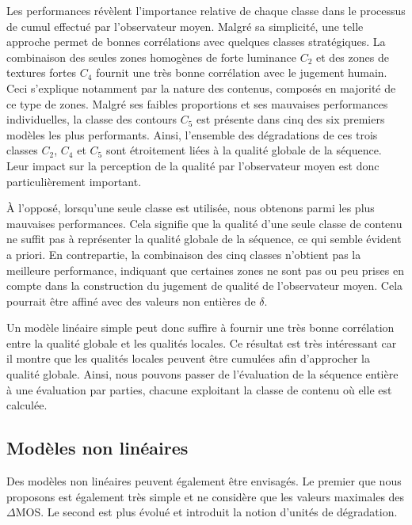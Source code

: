 Les performances révèlent l'importance relative de chaque classe dans le processus de cumul effectué par l'observateur moyen. Malgré sa simplicité, une telle approche permet de bonnes corrélations avec quelques classes stratégiques. La combinaison des seules zones homogènes de forte luminance $C_2$ et des zones de textures fortes $C_4$ fournit une très bonne corrélation avec le jugement humain. Ceci s'explique notamment par la nature des contenus, composés en majorité de ce type de zones. Malgré ses faibles proportions et ses mauvaises performances individuelles, la classe des contours $C_5$ est présente dans cinq des six premiers modèles les plus performants. Ainsi, l'ensemble des dégradations de ces trois classes $C_2$, $C_4$ et $C_5$ sont étroitement liées à la qualité globale de la séquence. Leur impact sur la perception de la qualité par l'observateur moyen est donc particulièrement important.

À l'opposé, lorsqu'une seule classe est utilisée, nous obtenons parmi les plus mauvaises performances. Cela signifie que la qualité d'une seule classe de contenu ne suffit pas à représenter la qualité globale de la séquence, ce qui semble évident a priori. En contrepartie, la combinaison des cinq classes n'obtient pas la meilleure performance, indiquant que certaines zones ne sont pas ou peu prises en compte dans la construction du jugement de qualité de l'observateur moyen. Cela pourrait être affiné avec des valeurs non entières de $\delta$.

Un modèle linéaire simple peut donc suffire à fournir une très bonne corrélation entre la qualité globale et les qualités locales. Ce résultat est très intéressant car il montre que les qualités locales peuvent être cumulées afin d'approcher la qualité globale. Ainsi, nous pouvons passer de l'évaluation de la séquence entière à une évaluation par parties, chacune exploitant la classe de contenu où elle est calculée.


\subsection{Modèles non linéaires}
Des modèles non linéaires peuvent également être envisagés. Le premier que nous proposons est également très simple et ne considère que les valeurs maximales des $\Delta$MOS. Le second est plus évolué et introduit la notion d'unités de dégradation.


